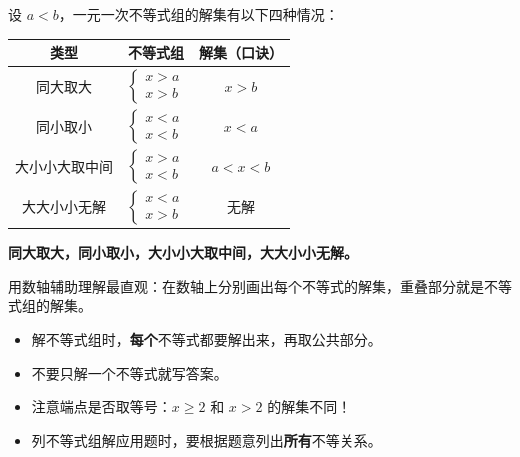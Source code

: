 \documentclass[12pt, a4paper]{ctexart}
\begin{document}
\begin{knowledgebox}[9.5.2 不等式组解集的四种情况]
设 $a < b$，一元一次不等式组的解集有以下四种情况：

\renewcommand{\arraystretch}{1.5}
\begin{center}
\begin{tabular}{|c|c|c|}
\hline
\textbf{类型} & \textbf{不等式组} & \textbf{解集（口诀）} \\
\hline
同大取大 & $\begin{cases} x > a \\ x > b \end{cases}$ & $x > b$ \\
\hline
同小取小 & $\begin{cases} x < a \\ x < b \end{cases}$ & $x < a$ \\
\hline
大小小大取中间 & $\begin{cases} x > a \\ x < b \end{cases}$ & $a < x < b$ \\
\hline
大大小小无解 & $\begin{cases} x < a \\ x > b \end{cases}$ & 无解 \\
\hline
\end{tabular}
\end{center}
\end{knowledgebox}

\begin{tipbox}[记忆口诀]
\textbf{同大取大，同小取小，大小小大取中间，大大小小无解。}

用数轴辅助理解最直观：在数轴上分别画出每个不等式的解集，重叠部分就是不等式组的解集。
\end{tipbox}

\begin{warnbox}[易错提醒]
\begin{itemize}[leftmargin=2em]
  \item 解不等式组时，\textbf{每个}不等式都要解出来，再取公共部分。
  \item 不要只解一个不等式就写答案。
  \item 注意端点是否取等号：$x \geqslant 2$ 和 $x > 2$ 的解集不同！
  \item 列不等式组解应用题时，要根据题意列出\textbf{所有}不等关系。
\end{itemize}
\end{warnbox}
\end{document}
